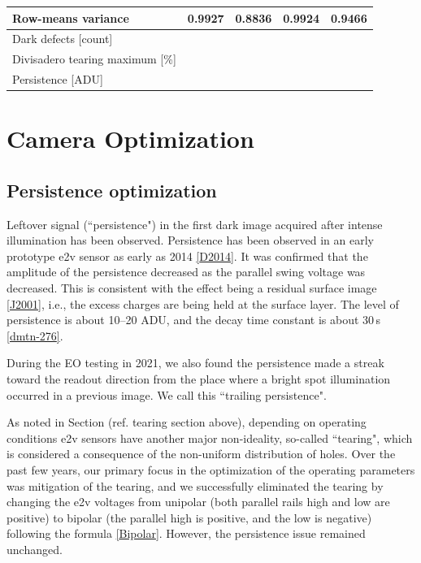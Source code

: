 \begin{table}[H]
\begin{tabular}{|l|ll|ll|}
Row-means variance                  & \multicolumn{1}{l|}{0.9927}    & 0.8836    & \multicolumn{1}{l|}{0.9924}    & 0.9466     \\ \hline
Dark defects {[}count{]}            & \multicolumn{1}{l|}{}          &           & \multicolumn{1}{l|}{}          &            \\ \hline
Divisadero tearing maximum {[}\%{]} & \multicolumn{1}{l|}{}          &           & \multicolumn{1}{l|}{}          &            \\ \hline
Persistence {[}ADU{]}               & \multicolumn{1}{l|}{}          &           & \multicolumn{1}{l|}{}          &            \\ \hline
\end{tabular}
\end{table}


\section{Camera Optimization}\label{camera-optimization}

\subsection{Persistence optimization}\label{sec:persistence-optimization}

Leftover signal (``persistence") in the first dark image acquired after intense illumination has
been observed.  Persistence has been observed
in an early prototype e2v sensor as early as 2014
\hyperref[D2014]{{[}D2014{]}}. It was confirmed that the amplitude of
the persistence decreased as the parallel swing voltage was decreased.
This is consistent with the effect being a residual surface image
\hyperref[J2001]{{[}J2001{]}}, i.e., the excess charges are being held
at the surface layer. The level of persistence is about 10--20 ADU,
and the decay time constant is about 30\,s
\hyperref[dmtn-276]{{[}dmtn-276{]}}.

During the EO testing in 2021, we also found the persistence made a
streak toward the readout direction from the place where a bright spot illumination occurred 
in a previous image. We call this ``trailing persistence".

As noted in Section (ref. tearing section above), depending on operating conditions e2v sensors have another major non-ideality, so-called ``tearing", which is
considered a consequence of the non-uniform distribution of holes. Over the past few years, our
primary focus in the optimization of the operating parameters was mitigation of the tearing, and we successfully eliminated the tearing by changing the
e2v voltages from unipolar (both parallel rails high and low
are positive) to bipolar (the parallel high is positive, and
the low is negative) following the formula
\hyperref[Bipolar]{{[}Bipolar{]}}. However, the persistence issue
remained unchanged.

